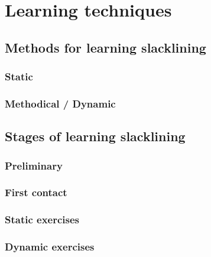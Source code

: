 \section{Learning techniques}\label{3_2_learningTechniques}

\subsection{Methods for learning slacklining}
\subsubsection{Static}
\subsubsection{Methodical / Dynamic}

\subsection{Stages of learning slacklining}
\subsubsection{Preliminary}
\subsubsection{First contact}
\subsubsection{Static exercises}
\subsubsection{Dynamic exercises}